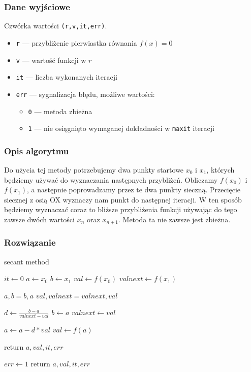 \documentclass{article}
\begin{document}
\subsubsection*{Dane wyjściowe}
	Czwórka wartości \texttt{(r,v,it,err)}.
	\begin{itemize}
	    \item \texttt{r} — przybliżenie pierwiastka równania $f(x) = 0$
	    \item \texttt{v} — wartość funkcji w $r$
	    \item \texttt{it} — liczba wykonanych iteracji
	    \item \texttt{err} — sygnalizacja błędu, możliwe wartości:
	    \begin{itemize}
	        \item \texttt{0} — metoda zbieżna
	        \item \texttt{1} — nie osiągnięto wymaganej dokładności w \texttt{maxit} iteracji
	    \end{itemize}
	\end{itemize}
\subsubsection*{Opis algorytmu}
	Do użycia tej metody potrzebujemy dwa punkty startowe $x_0$ i $x_1$, których będziemy używać do wyznaczania następnych przybliżeń. Obliczamy $f(x_0)$ i $f(x_1)$, a następnie poprowadzamy przez te dwa punkty sieczną. Przecięcie siecznej z osią OX wyznaczy nam punkt do następnej iteracji. W ten sposób będziemy wyznaczać coraz to bliższe przybliżenia funkcji używając do tego zawsze dwóch wartości $x_n$ oraz $x_{n+1}$.
	Metoda ta nie zawsze jest zbieżna.
\subsubsection*{Rozwiązanie}
	\begin{algorithm}[H]
	\caption{secant method}
	\begin{algorithmic}
		\State $it \gets 0$
		\State $a \gets x_0$
		\State $b \gets x_1$
		\State $val \gets f(x_0)$
		\State $val next \gets f(x_1)$

				\State $a, b = b, a$
				\State $val, val next = val next, val$
			\EndIf

			\State $d \gets \frac{b - a}{val next - val}$
			\State $b \gets a$
			\State $val next \gets val$

			\State $a \gets a - d * val$
			\State $val \gets f(a)$

				\State return $a, val, it ,err$
			\EndIf
		\EndFor

		\State $err \gets 1$
		\State return $a, val, it, err$
    \end{algorithmic}
    \end{algorithm}
\end{document}
